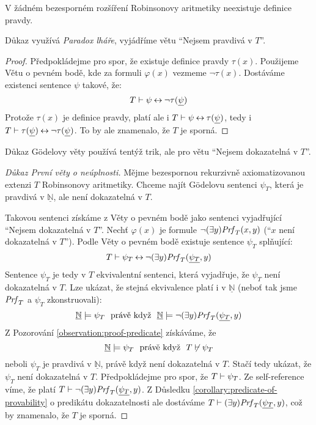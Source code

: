 \begin{theorem}
    V žádném bezesporném rozšíření Robinsonovy aritmetiky neexistuje definice pravdy.
\end{theorem}
Důkaz využívá \emph{Paradox lháře}, vyjádříme větu ``Nejsem pravdivá v $T$''.
\begin{proof}
Předpokládejme pro spor, že existuje definice pravdy $\tau(x)$.
Použijeme Větu o pevném bodě, kde za formuli $\varphi(x)$ vezmeme $\neg\tau(x)$. Dostáváme existenci sentence $\psi$ takové, že:
$$
T\vdash\psi\mathbin{\leftrightarrow}\neg\tau(\underline{\psi})
$$
Protože $\tau(x)$ je definice pravdy, platí ale i $T\vdash\psi\mathbin{\leftrightarrow}\tau(\underline{\psi})$, tedy i $T\vdash\tau(\underline{\psi})\mathbin{\leftrightarrow}\neg\tau(\underline{\psi})$. To by ale znamenalo, že $T$ je sporná.
\end{proof}

Důkaz Gödelovy věty používá tentýž trik, ale pro větu ``Nejsem dokazatelná v $T$''.

\begin{proof}[Důkaz První věty o neúplnosti]
Mějme bezespornou rekurzivně axiomatizovanou extenzi $T$ Robinsonovy aritmetiky. Chceme najít Gödelovu sentenci $\psi_T$, která je pravdivá v $\underline{\mathbb N}$, ale není dokazatelná v $T$.

Takovou sentenci získáme z Věty o pevném bodě jako sentenci vyjadřující ``Nejsem dokazatelná v $T$''. Nechť $\varphi(x)$ je formule $\neg(\exists y)\mathit{Prf}_T(x,y)$ (``$x$ není dokazatelná v $T$''). Podle Věty o pevném bodě existuje sentence $\psi_T$ splňující:
$$
T\vdash\psi_T\mathbin{\leftrightarrow}\neg(\exists y)\mathit{Prf}_T(\underline{\psi_T},y)
$$
Sentence $\psi_T$ je tedy v $T$ ekvivalentní sentenci, která vyjadřuje, že $\psi_T$ není dokazatelná v $T$. Lze ukázat, že stejná ekvivalence platí i v $\underline{\mathbb N}$ (neboť tak jsme $\mathit{Prf}_T$ a $\psi_T$ zkonstruovali):
$$
\underline{\mathbb N}\models\psi_T\ \text{ právě když }\ \underline{\mathbb N}\models\neg(\exists y)\mathit{Prf}_T(\underline{\psi_T},y)
$$
Z Pozorování \ref{observation:proof-predicate} získáváme, že 
$$
\underline{\mathbb N}\models\psi_T\ \text{ právě když }\ T\not\vdash\psi_T
$$
neboli $\psi_T$ je pravdivá v $\underline{\mathbb N}$, právě když není dokazatelná v $T$. Stačí tedy ukázat, že $\psi_T$ není dokazatelná v $T$. Předpokládejme pro spor, že $T\vdash\psi_T$. Ze self-reference víme, že platí
$T\vdash\neg(\exists y)\mathit{Prf}_T(\underline{\psi_T},y)$.
Z Důsledku \ref{corollary:predicate-of-provability} o predikátu dokazatelnosti ale dostáváme $T\vdash (\exists y)\mathit{Prf}_T(\underline{\psi_T},y)$, což by znamenalo, že $T$ je sporná.
\end{proof}


